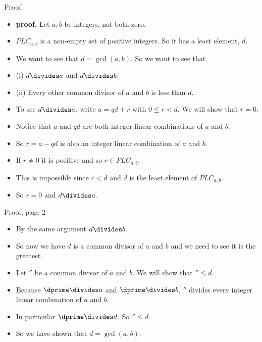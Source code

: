 \documentclass{beamer}
\begin{document}
\begin{frame}{Proof}

\begin{itemize}
  \item \textbf{proof.} Let $a,b$ be integers, not both zero.
  \item $PLC_{a,b}$ is a non-empty set of positive integers. So it has a least element,  $d$.
  \item We want to see that $d=\gcd(a,b)$. So we want to see that
  \item (i) $d\divides a$ and $d\divides b$.
  \item (ii) Every other common divisor of $a$ and $b$ is less than $d$.
  \item To see $d\divides a$, write $a = qd + r$ with $0\leq r < d$.  We will show that $r=0$.
  \item Notice that $a$ and $qd$ are both integer linear combinations of $a$ and $b$.
  \item So $r=a-qd$ is also an integer linear combination of $a$ and $b$.
  \item If $r\not=0$ it is positive and so $r\in PLC_{a,b}$.
  \item This is impossible since $r<d$ and $d$ is the least element of $PLC_{a,b}$.
  \item So $r=0$ and $d\divides a$.
\end{itemize}

\end{frame}

\begin{frame}{Proof, page 2}

\begin{itemize}
  \item By the same argument $d\divides b$.
  \item So now we have $d$ is a common divisor of $a$ and $b$ and we need to see it is the greatest.
  \item Let $\dprime$ be a common divisor of $a$ and $b$. We will show that $\dprime \leq d$.
  \item Because $\dprime \divides a$ and $\dprime \divides b$, $\dprime$ divides every integer
  linear combination of $a$ and $b$.
  \item In particular $\dprime \divides d$. So $\dprime \leq d$.
  \item So we have shown that $d=\gcd(a,b)$.
\end{itemize}

\end{frame}
\end{document}
